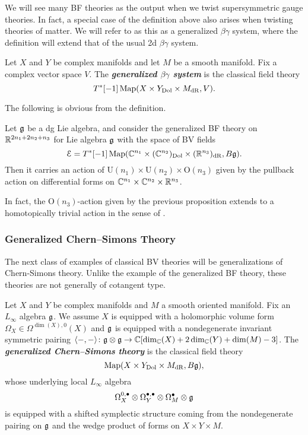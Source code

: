 \documentclass[10pt, oneside]{article}
\renewcommand{\U}{\mathrm{U}}
\newcommand{\defterm}[1]{\textbf{\emph{#1}}}
\begin{document}
We will see many BF theories as the output when we twist supersymmetric gauge theories.
In fact, a special case of the definition above also arises when twisting theories of matter.  We will refer to as this as a generalized $\beta\gamma$ system, where the definition will extend that of the usual 2d $\beta \gamma$ system. 

\begin{definition}
Let $X$ and $Y$ be complex manifolds and let $M$ be a smooth manifold. Fix a complex vector space $V$. The \defterm{generalized $\beta\gamma$ system} is the classical field theory
\[T^*[-1]\operatorname{Map}(X\times Y_{\mathrm{Dol}}\times M_{\mathrm{dR}}, V).\]
\end{definition}

The following is obvious from the definition.

\begin{prop}
Let $\mathfrak g$ be a dg Lie algebra, and consider the generalized BF theory on $\mathbb R^{2n_1+2n_2+n_3}$ for Lie algebra $\mathfrak g$ with the space of BV fields
\[\mathcal E = T^*[-1]\operatorname{Map}(\mathbb C^{n_1}\times (\mathbb C^{n_2})_{\mathrm{Dol}}\times (\mathbb R^{n_3})_{\mathrm{dR}}, B\mathfrak g).\]
Then it carries an action of $\U(n_1)\times \U(n_2)\times \mathrm{O}(n_3)$ given by the pullback action on differential forms on $\mathbb C^{n_1}\times \mathbb C^{n_2}\times \mathbb R^{n_3}$.
\label{prop:BFrotationaction}
\end{prop}

\begin{remark}
In fact, the $\mathrm{O}(n_3)$-action given by the previous proposition extends to a homotopically trivial action in the sense of \cite[Section 2.4]{ElliottSafronov}.
\end{remark}

\subsubsection{Generalized Chern--Simons Theory} \label{gen_CS_section}
The next class of examples of classical BV theories will be generalizations of Chern-Simons theory. Unlike the example of the generalized BF theory, these theories are not generally of cotangent type.

\begin{definition}
Let $X$ and $Y$ be complex manifolds and $M$ a smooth oriented manifold. Fix an $L_\infty$ algebra $\mathfrak g$. We assume $X$ is equipped with a holomorphic volume form $\Omega_X \in\Omega^{\dim(X), 0}(X)$ and $\mathfrak g$ is equipped with a nondegenerate invariant symmetric pairing $\langle-, -\rangle\colon \mathfrak g\otimes\mathfrak g\rightarrow \mathbb C[\dim_\mathbb C(X) + 2\dim_\mathbb C(Y) + \dim(M) - 3]$. The \defterm{generalized Chern--Simons theory} is the classical field theory
\[\operatorname{Map}(X\times Y_{\mathrm{Dol}}\times M_{\mathrm{dR}}, B\mathfrak g),\]
whose underlying local $L_\infty$ algebra
\[\Omega^{0,\bullet}_X \otimes \Omega^{\bullet,\bullet}_Y \otimes \Omega^\bullet_M \otimes \mathfrak g\]
is equipped with a shifted symplectic structure coming from the nondegenerate pairing on $\mathfrak g$ and the wedge product of forms on $X\times Y\times M$.
\label{def:generalizedCS}
\end{definition}
\end{document}
